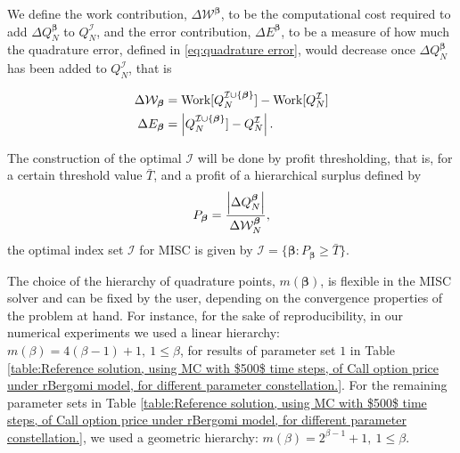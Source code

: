 We define the work contribution, $\Delta \mathcal{W}^{\boldsymbol{\beta}}$, to be the computational cost  required to add  $\Delta Q_N^{\boldsymbol{\beta}}$ to $Q^{\mathcal{I}}_N$, and the error contribution, $\Delta E^{\boldsymbol{\beta}}$, to be  a measure of how much the quadrature error, defined in \eqref{eq:quadrature error}, would decrease once $\Delta Q_N^{\boldsymbol{\beta}}$  has been added to  $Q^{\mathcal{I}}_N$, that is 


\begin{align}\label{eq:Work_error_contributions}
\Delta \mathcal{W}_{\boldsymbol{\beta}} &= \text{Work}[Q^{\mathcal{I} \cup \{\boldsymbol{\beta}\}}_N]-\text{Work}[Q^{\mathcal{I}}_N] \nonumber\\
\Delta E_{\boldsymbol{\beta}} &= \left\lvert Q^{\mathcal{I} \cup \{\boldsymbol{\beta}\}}_N]-Q^{\mathcal{I}}_N\right\rvert.
\end{align}



 The  construction of the optimal  $\mathcal{I}$ will be done by profit thresholding, that is, for a certain threshold value $\bar{T}$, and a profit of a hierarchical surplus defined by
 \begin{equation*}
 P_{\boldsymbol{\beta}}= \frac{\left\lvert\Delta Q_N^{\boldsymbol{\beta}}\right\rvert}{\Delta\mathcal{W}_N^{\boldsymbol{\beta}}},
 \end{equation*}
  the optimal index set  $\mathcal{I}$  for MISC  is given by 
 $\mathcal{I}=\{\boldsymbol{\beta}: P_{\boldsymbol{\beta}}	 \ge \bar{T}\}$.



\begin{remark}
	The choice of the hierarchy of quadrature points, $m(\boldsymbol{\beta})$, is flexible in the MISC solver and can be fixed by the user, depending on the convergence properties of the problem at hand. For instance, for the sake of reproducibility, in our numerical experiments we used a linear hierarchy: $m(\beta)=4 (\beta-1)+1,\: 1 \le \beta $, for results of parameter set $1$ in Table \ref{table:Reference solution, using MC with $500$ time steps, of Call option price under rBergomi model, for different parameter constellation.}. For the remaining parameter sets in Table  \ref{table:Reference solution, using MC with $500$ time steps, of Call option price under rBergomi model, for different parameter constellation.}, we used a geometric hierarchy: $m(\beta)=2^{\beta-1}+1, \:1 \le \beta $.
\end{remark} 


